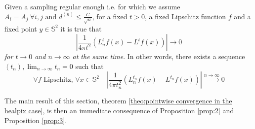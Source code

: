 \vspace{0.5cm}
\begin{prop}\label{prop:2}
	Given a sampling regular enough i.e. for which we assume $A_i=A_j \ \forall i,j\text{ and }d^{(n)}\leq \frac{C}{\sqrt{n}}$, for a fixed $t>0$, a fixed Lipschitz function $f$ and a fixed point $y\in\mathbb S^2$ it is true that
$$\left|\frac{1}{4\pi t^2}\left(L_n^tf(x) -L^tf(x)\right)\right|\rightarrow0$$
\textit{for $t\to0$ and $n\to\infty$ at the same time}. In other words, there exists a sequence $(t_n), \lim_{n\to\infty}t_n=0$ such that 
$$\forall f \text{ Lipschitz, } \forall x\in\mathbb S^2 \quad \left|\frac{1}{4\pi t_n^2}\left(L_n^{t_n}f(x) - L^{t_n}f(x)\right)\right|\xrightarrow{n\to \infty}0$$
\end{prop}
\vspace{0.5cm}

The main result of this section, theorem  \ref{theo:pointwise convergence in the healpix case}, is then an immediate consequence of Proposition \ref{prop:2} and Proposition \ref{prop:3}.


